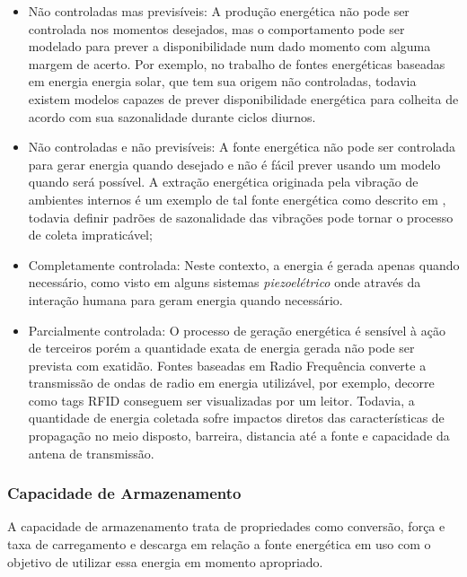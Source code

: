 \begin{itemize}

    \item Não controladas mas previsíveis: A produção energética não pode ser controlada nos momentos desejados, mas o comportamento pode ser modelado para prever a disponibilidade num dado momento com alguma margem de acerto. Por exemplo, no trabalho de  \cite{lee_energy_2018} fontes energéticas baseadas em energia energia solar, que tem sua origem não controladas, todavia existem modelos capazes de prever  disponibilidade energética para colheita de acordo com sua sazonalidade durante ciclos diurnos.
    
    \item Não controladas e não previsíveis: A fonte energética não pode ser controlada para gerar energia quando desejado e não é fácil prever usando um modelo quando será possível. A extração energética originada pela vibração de ambientes internos é um exemplo de tal fonte energética como descrito em \cite{wei_comprehensive_2017}, todavia definir padrões de sazonalidade das vibrações pode tornar o processo de coleta impraticável;
    
    \item Completamente controlada: Neste contexto, a energia é gerada apenas quando necessário, como visto em alguns sistemas \textit{piezoelétrico} onde através da interação humana para geram energia quando necessário.
    
    \item Parcialmente controlada: O processo de geração energética é sensível à ação de terceiros porém a quantidade exata de energia gerada não pode ser prevista com exatidão. Fontes baseadas em Radio Frequência converte a transmissão de ondas de radio em energia utilizável, por exemplo, \cite{shaikh_energy_2016} decorre como tags \acf{RFID} conseguem ser visualizadas por um leitor. Todavia, a quantidade de energia coletada sofre impactos diretos das características de propagação no meio disposto, barreira, distancia até a fonte e capacidade da antena de transmissão.
\end{itemize}

\subsubsection{Capacidade de Armazenamento}
A capacidade de armazenamento trata de propriedades como conversão, força e taxa de carregamento e descarga em relação a fonte energética em uso com o objetivo de utilizar essa energia em momento apropriado. 

